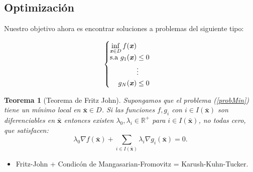 \documentclass[9pt]{beamer}
\newtheorem{teorema}{Teorema}
\newcommand{\RR}{\mathbb{R}}
\newcommand{\xx}{\textbf{\emph{x}}}
\newcommand{\barxx}{\bar{\mathbf{x}}}
\begin{document}
	\subsection{Optimización}
	\begin{frame}{}
		Nuestro objetivo ahora es encontrar soluciones a problemas del siguiente tipo:
		
		\begin{equation}\label{probMin}
		\begin{cases}
		\displaystyle\inf_{\xx\in D} f(\xx)\\
		\begin{split}
		\text{s.a } g_1(\xx) &\leq 0 \\
		&\vdots \\
		g_N(\xx) &\leq 0
		\end{split}
		
		\end{cases} 
		\end{equation}
		\begin{teorema}[Teorema de Fritz John]\label{FritzJohn}
			Supongamos que el problema (\ref{probMin}) tiene un mínimo local en $ \barxx \in D $. Si las funciones $ f, g_i $ con $ i \in I(\barxx) $ son diferenciables en $ \barxx $ entonces existen $ \lambda_0, \lambda_i \in \RR^+ $ para $ i \in I(\barxx) $, no todas cero, que satisfacen:
			\[
			\lambda_0 \nabla f(\barxx) + \sum_{i \in I(\barxx)} \lambda_i \nabla g_i(\barxx) = 0.
			\]
		\end{teorema}
		
		\begin{itemize}
			\item Fritz-John + Condicón de Mangasarian-Fromovitz = Karush-Kuhn-Tucker.
		\end{itemize}
	\end{frame}
\end{document}

